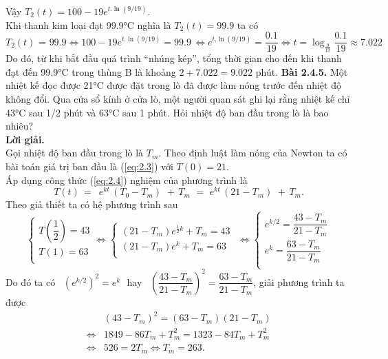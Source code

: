Vậy  ${{T}_{2}}(t)=100-19{{e}^{t.\ln (9/19)}}$. \\
Khi thanh kim loại đạt 99.9°C nghĩa là $T_2(t) = 99.9$ ta có 
\[{{T}_{2}}\left( t \right)\text{ = }99.9\Leftrightarrow 100-19{{e}^{t.\ln (9/19)}}=99.9\,\Leftrightarrow {{e}^{t.\ln (9/19)}}=\dfrac{0.1}{19}\Leftrightarrow t={{\log }_{\frac{9}{19}}}\dfrac{0.1}{19}\approx 7.022\]
Do đó, từ khi bắt đầu quá trình “nhúng kép”, tổng thời gian cho đến khi thanh đạt đến 99.9°C trong thùng B là khoảng $2+7.022= 9.022$ phút.\newpage
\noindent\textbf{Bài 2.4.5. }Một nhiệt kế đọc được 21°C được đặt trong lò đã được làm nóng trước đến nhiệt độ không đổi. Qua cửa sổ kính ở cửa lò, một người quan sát ghi lại rằng nhiệt kế chỉ 43°C sau 1/2 phút và 63°C sau 1 phút. Hỏi nhiệt độ ban đầu trong lò là bao~ nhiêu?\\
\textbf{Lời giải. }\\
Gọi nhiệt độ ban đầu trong lò là   ${{T}_{m}}$. Theo định luật làm nóng của Newton ta có bài toán giá trị ban đầu là (\ref{eq:2.3}) với $T(0)=21$. \\
Áp dụng công thức (\ref{eq:2.4}) nghiệm của phương trình là \[T(t)\,=\,\,\,{{e}^{kt}}\,({{T}_{0}}-{{T}_{m}})\,\,+\,{{T}_{m}}\,\,=\,\,{{e}^{kt}}\,(21-{{T}_{m}})\,\,+\,{{T}_{m}}.\]
Theo giả thiết ta có hệ phương trình sau
\[\left\{ \begin{array}{l}
	 T(\dfrac{1}{2})=43 \\ 
	 T(1)=63 \\ 
\end{array} \right.\Leftrightarrow \left\{ \begin{array}{l}
	 (21-{{T}_{m}}){{e}^{\frac{1}{2}k}}+{{T}_{m}}=43\,\, \\ 
	 (21-{{T}_{m}}){{e}^{k}}+{{T}_{m}}=63\,\, \\ 
\end{array} \right.\Leftrightarrow \left\{ \begin{array}{l}
	 {{e}^{k/2}}=\dfrac{43-{{T}_{m}}}{21-{{T}_{m}}} \\ 
	 {{e}^{k}}=\dfrac{63-{{T}_{m}}}{21-{{T}_{m}}} \\ 
\end{array} \right.\]
Do đó ta có $\,\,\,{{({{e}^{k/2}})}^{2}}={{e}^{k}}\,\,$ hay $\,\,\,{{\left( \dfrac{43-{{T}_{m}}}{21-{{T}_{m}}} \right)}^{2}}=\dfrac{63-{{T}_{m}}}{21-{{T}_{m}}}$, giải phương trình ta được
$$
\begin{array}{ll}
 &{{(43-{{T}_{m}})}^{2}}=(63-{{T}_{m}})(21-{{T}_{m}}) \\
	 \Leftrightarrow &1849-86{{T}_{m}}+T_{m}^{2}=1323-84{{T}_{m}}+T_{m}^{2}\, \\
	\Leftrightarrow &526=2{{T}_{m}}\Leftrightarrow {{T}_{m}}=263. 
	\end{array}
	$$
